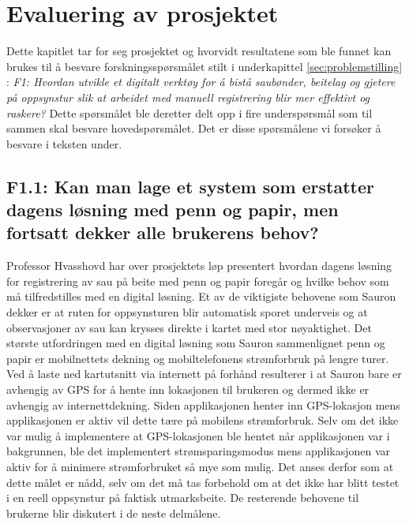 \chapter{Evaluering av prosjektet}
Dette kapitlet tar for seg prosjektet og hvorvidt resultatene som ble funnet kan brukes til å besvare forskningsspørsmålet stilt i underkapittel \ref{sec:problemstilling} : \textit{F1: Hvordan utvikle et digitalt verktøy for å bistå saubønder, beitelag og gjetere på oppsynstur slik at arbeidet med manuell registrering blir mer effektivt og raskere?} Dette spørsmålet ble deretter delt opp i fire underspørsmål som til sammen skal besvare hovedspørsmålet. Det er disse spørsmålene vi forsøker å besvare i teksten under.

\section{F1.1: Kan man lage et system som erstatter dagens løsning med penn og papir, men fortsatt dekker alle brukerens behov?}
Professor Hvasshovd har over prosjektets løp presentert hvordan dagens løsning for registrering av sau på beite med penn og papir foregår og hvilke behov som må tilfredstilles med en digital løsning. Et av de viktigiste behovene som Sauron dekker er at ruten for oppsynsturen blir automatisk sporet underveis og at observasjoner av sau kan krysses direkte i kartet med stor nøyaktighet. Det største utfordringen med en digital løsning som Sauron sammenlignet penn og papir er mobilnettets dekning og mobiltelefonens strømforbruk på lengre turer. Ved å laste ned kartutsnitt via internett på forhånd resulterer i at Sauron bare er avhengig av GPS for å hente inn lokasjonen til brukeren og dermed ikke er avhengig av internettdekning. Siden applikasjonen henter inn GPS-lokasjon mens applikasjonen er aktiv vil dette tære på mobilens strømforbruk. Selv om det ikke var mulig å implementere at GPS-lokasjonen ble hentet når applikasjonen var i bakgrunnen, ble det implementert strømsparingsmodus mens applikasjonen var aktiv for å minimere strømforbruket så mye som mulig. Det anses derfor som at dette målet er nådd, selv om det må tas forbehold om at det ikke har blitt testet i en reell oppsynstur på faktisk utmarksbeite. De resterende behovene til brukerne blir diskutert i de neste delmålene. 

